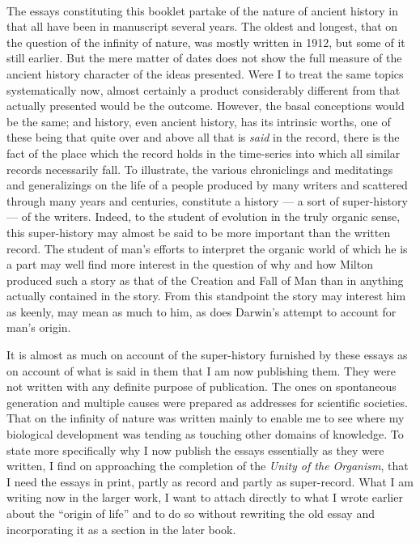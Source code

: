 \documentclass[a4paper, 11pt, oneside, polutonikogreek, english, landscape]{article}
\begin{document}
\paragraph{}
The essays constituting this booklet partake of the nature of ancient history in that all have been in manuscript several years. The oldest and longest, that on the question of the infinity of nature, was mostly written in 1912, but some of it still earlier. But the mere matter of dates does not show the full measure of the ancient history character of the ideas presented. Were I to treat the same topics systematically now, almost certainly a product considerably different from that actually presented would be the outcome. However, the basal conceptions would be the same; and history, even ancient history, has its intrinsic worths, one of these being that quite over and above all that is \emph{said} in the record, there is the fact of the place which the record holds in the time-series into which all similar records necessarily fall. To illustrate, the various chroniclings and meditatings and generalizings on the life of a people produced by many writers and scattered through many years and centuries, constitute a history --- a sort of super-history --- of the writers. Indeed, to the student of evolution in the truly organic sense, this super-history may almost be said to be more important than the written record. The student of man's efforts to interpret the organic world of which he is a part may well find more interest in the question of why and how Milton produced such a story as that of the Creation and Fall of Man than in anything actually contained in the story. From this standpoint the story may interest him as keenly, may mean as much to him, as does Darwin's attempt to account for man's origin.

It is almost as much on account of the super-history furnished by these essays as on account of what is said in them that I am now publishing them. They were not written with any definite purpose of publication. The ones on spontaneous generation and multiple causes were prepared as addresses for scientific societies. That on the infinity of nature was written mainly to enable me to see where my biological development was tending as touching other domains of knowledge. To state more specifically why I now publish the essays essentially as they were written, I find on approaching the completion of the \emph{Unity of the Organism}, that I need the essays in print, partly as record and partly as super-record. What I am writing now in the larger work, I want to attach directly to what I wrote earlier about the ``origin of life'' and to do so without rewriting the old essay and incorporating it as a section in the later book.
\end{document}
